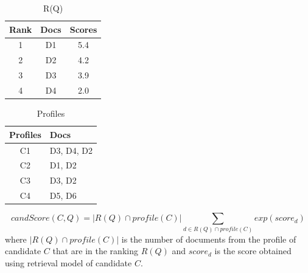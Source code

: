 \begin{table}
\centering
\begin{tabular}{|c|c|c|}
\hline \textbf{Rank} & \textbf{Docs} & \textbf{Scores}\\
\hline 1 & D1 & 5.4 \\
\hline 2 & D2 & 4.2\\
\hline 3 & D3 & 3.9 \\
\hline 4 & D4 & 2.0 \\  
\hline
\end{tabular}
\caption{R(Q)} \label{table:ranking}
\end{table}
\quad
\begin{table}
\centering
\begin{tabular}{|c|l|}
\hline \textbf{Profiles} & \textbf{Docs}\\
\hline C1 & D3, D4, D2 \\
\hline C2 & D1, D2 \\
\hline C3 & D3, D2 \\
\hline C4 & D5, D6 \\  
\hline
\end{tabular}
\caption{Profiles} \label{table:profiles}
\end{table}

\[
candScore(C,Q) = |R(Q) \cap profile(C)| \sum_{d \in R(Q) \cap profile(C)} exp(score_d)
\]
where $|R(Q) \cap profile(C)|$ is the number of documents from the profile of candidate $C$ that are in the ranking $R(Q)$ and $score_d$ is the score
obtained using retrieval model of candidate $C$.














